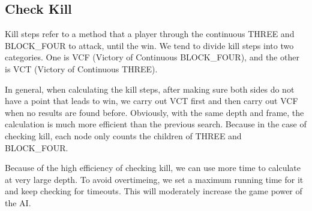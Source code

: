 \documentclass[a4paper, 12pt]{article} %
\begin{document}
\begin{multicols}{2}
    \subsection{Check Kill}
    Kill steps refer to a method that a player through the continuous THREE and BLOCK\_FOUR to attack, until the win. We tend to divide kill steps into two categories. One is VCF (Victory of Continuous BLOCK\_FOUR), and the other is VCT (Victory of Continuous THREE).
    
	In general, when calculating the kill steps, after making sure both sides do not have a point that leads to win, we carry out VCT first and then carry out VCF when no results are found before. Obviously, with the same depth and frame, the calculation is much more efficient than the previous search. Because in the case of checking kill, each node only counts the children of THREE and BLOCK\_FOUR. 
	
	Because of the high efficiency of checking kill, we can use more time to calculate at very large depth. To avoid overtimeing, we set a maximum running time for it and keep checking for timeouts. This will moderately increase the game power of the AI.


\end{multicols}
\end{document}
